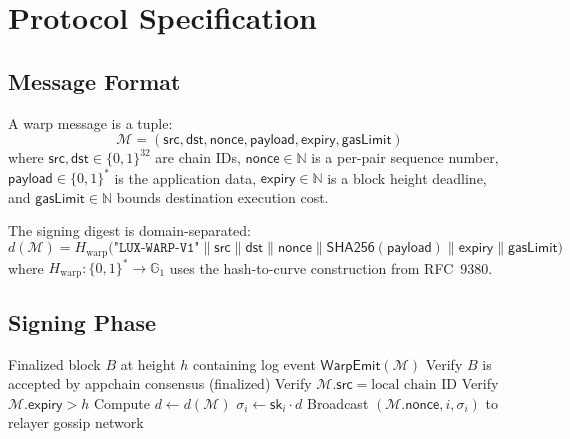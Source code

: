 \section{Protocol Specification}
\label{sec:protocol}

\subsection{Message Format}

\begin{definition}
A warp message is a tuple:
\begin{equation}
    \mathcal{M} = (\mathsf{src}, \mathsf{dst}, \mathsf{nonce}, \mathsf{payload}, \mathsf{expiry}, \mathsf{gasLimit})
\end{equation}
where $\mathsf{src}, \mathsf{dst} \in \{0,1\}^{32}$ are chain IDs, $\mathsf{nonce} \in \mathbb{N}$ is a per-pair sequence number, $\mathsf{payload} \in \{0,1\}^*$ is the application data, $\mathsf{expiry} \in \mathbb{N}$ is a block height deadline, and $\mathsf{gasLimit} \in \mathbb{N}$ bounds destination execution cost.
\end{definition}

The signing digest is domain-separated:
\begin{equation}
    d(\mathcal{M}) = H_{\text{warp}}\bigl(\texttt{"LUX-WARP-V1"} \| \mathsf{src} \| \mathsf{dst} \| \mathsf{nonce} \| \mathsf{SHA256}(\mathsf{payload}) \| \mathsf{expiry} \| \mathsf{gasLimit}\bigr)
\end{equation}
where $H_{\text{warp}} : \{0,1\}^* \to \mathbb{G}_1$ uses the hash-to-curve construction from RFC~9380.

\subsection{Signing Phase}

\begin{algorithm}[H]
\caption{Warp Message Signing (Validator $v_i$)}
\label{alg:signing}
\begin{algorithmic}[1]
\Require Finalized block $B$ at height $h$ containing log event $\mathsf{WarpEmit}(\mathcal{M})$
\State Verify $B$ is accepted by appchain consensus (finalized)
\State Verify $\mathcal{M}.\mathsf{src} = \text{local chain ID}$
\State Verify $\mathcal{M}.\mathsf{expiry} > h$
\State Compute $d \gets d(\mathcal{M})$
\State $\sigma_i \gets \mathsf{sk}_i \cdot d$ 
\State Broadcast $(\mathcal{M}.\mathsf{nonce}, i, \sigma_i)$ to relayer gossip network
\end{algorithmic}
\end{algorithm}

